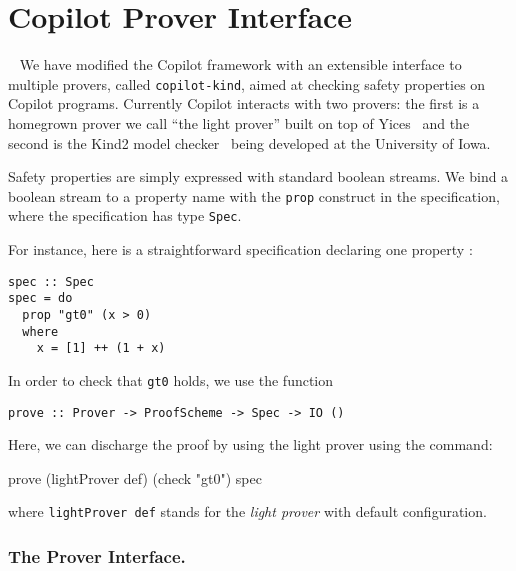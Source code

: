 \section{Copilot Prover Interface}~\label{sec:prover} 
We have modified  the Copilot framework with an extensible interface  to multiple
provers, called \texttt{copilot-kind}, aimed at checking  safety properties on Copilot
programs. Currently Copilot interacts with two provers: the first is a
homegrown prover we call ``the light prover'' built on top of
Yices~\cite{Dutertre:cav2014} and the second is the Kind2 model checker~\cite{kind2} being developed at
the University of Iowa.

Safety properties are simply expressed with
standard boolean streams.  We bind a boolean stream to a property name
with the \texttt{prop} construct in the specification, where the
specification has type \texttt{Spec}.

For instance, here is a straightforward specification declaring one
property :

\begin{lstlisting}[frame=single]
spec :: Spec
spec = do
  prop "gt0" (x > 0)
  where
    x = [1] ++ (1 + x)
\end{lstlisting}

In order  to check that \texttt{gt0} holds, we use
the function

\begin{lstlisting}[frame=single]
    prove :: Prover -> ProofScheme -> Spec -> IO ()
\end{lstlisting}

Here, we can discharge the proof by  using the light prover using the command:
\begin{code}
prove (lightProver def) (check "gt0") spec
\end{code}
where \texttt{lightProver def} stands for the \emph{light prover} with
default configuration.  

\subsubsection{The Prover Interface.}\label{the-prover-interface}

